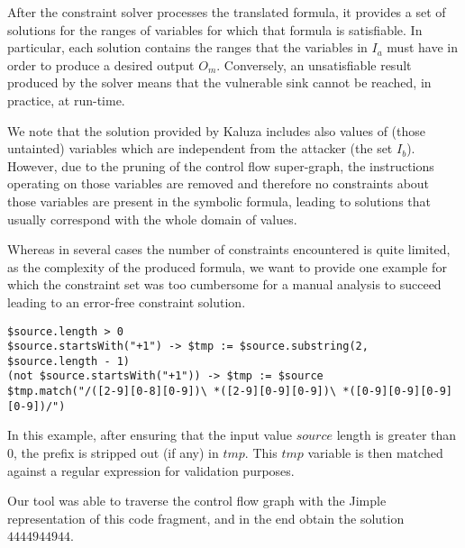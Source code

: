 



After the constraint solver processes the translated formula, it provides a set of solutions for the ranges of variables for which that formula is satisfiable. In particular, each solution contains the ranges that the variables in $I_a$ must have in order to produce a desired output $O_m$.
Conversely, an unsatisfiable result produced by the solver means that the vulnerable sink cannot be reached, in practice, at run-time.

We note that the solution provided by Kaluza includes also values of (those untainted) variables which are independent from the attacker (the set $I_b$). However, due to the pruning of the control flow super-graph, the instructions operating on those variables are removed and therefore no constraints about those variables are present in the symbolic formula, leading to solutions that usually correspond with the whole domain of values.

Whereas in several cases the number of constraints encountered is quite limited, as the complexity of
the produced formula, we want to provide one example for which the constraint set was too cumbersome
for a manual analysis to succeed leading to an error-free constraint solution.
\lstset{numbers=left, basicstyle=\ttfamily\scriptsize, breaklines=true}
\begin{lstlisting}
$source.length > 0
$source.startsWith("+1") -> $tmp := $source.substring(2, $source.length - 1)
(not $source.startsWith("+1")) -> $tmp := $source
$tmp.match("/([2-9][0-8][0-9])\ *([2-9][0-9][0-9])\ *([0-9][0-9][0-9][0-9])/")
\end{lstlisting}

In this example, after ensuring that the input value $source$ length is greater than 0,
the prefix is stripped out (if any) in $tmp$.
This $tmp$ variable is then matched against a regular expression for validation purposes.

Our tool was able to traverse the control flow graph with the Jimple representation of this code fragment,
 and in the end obtain the solution $444494 4944$.
